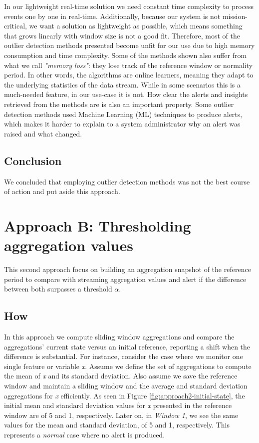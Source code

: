 In our lightweight real-time solution we need constant time complexity to process events one by one in real-time. Additionally, because our system is not mission-critical, we want a solution as lightweight as possible, which means something that grows linearly with window size is not a good fit. Therefore, most of the outlier detection methods presented become unfit for our use due to high memory consumption and time complexity. Some of the methods shown also suffer from what we call \textit{"memory loss"}: they lose track of the reference window or normality period. In other words, the algorithms are online learners, meaning they adapt to the underlying statistics of the data stream. While in some scenarios this is a much-needed feature, in our use-case it is not. How clear the alerts and insights retrieved from the methods are is also an important property. Some outlier detection methods used Machine Learning (ML) techniques to produce alerts, which makes it harder to explain to a system administrator why an alert was raised and what changed.

\subsection*{Conclusion}
We concluded that employing outlier detection methods was not the best course of action and put aside this approach.

\section{Approach B: Thresholding aggregation values}
This second approach focus on building an aggregation snapshot of the reference period to compare with streaming aggregation values and alert if the difference between both surpasses a threshold $\alpha$.

\subsection*{How}

In this approach we compute sliding window aggregations and compare the aggregations’ current state versus an initial reference, reporting a shift when the difference is substantial. For instance, consider the case where we monitor one single feature or variable \textit{x}. Assume we define the set of aggregations to compute the mean of \textit{x} and its standard deviation. Also assume we save the reference window and maintain a sliding window and the average and standard deviation aggregations for \textit{x} efficiently. As seen in Figure \ref{fig:approach2-initial-state}, the initial mean and standard deviation values for \textit{x} presented in the reference window are of 5 and 1, respectively. Later on, in \textit{Window 1}, we see the same values for the mean and standard deviation, of 5 and 1, respectively. This represents a \textit{normal} case where no alert is produced.

